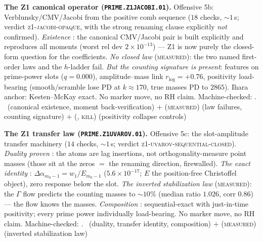 \par\smallskip\noindent\textbf{The Z1 canonical operator
(\texttt{PRIME.Z1JACOBI.01}).}
Offensive 5b: Verblunsky/CMV/Jacobi from the positive comb sequence
($18$ checks, ${\sim}1$\,s; verdict \textsc{z1-jacobi-opaque}, with
the strong renaming clause explicitly \emph{not} confirmed).
\emph{Existence} \mE: the canonical CMV/Jacobi pair is built
explicitly and reproduces all moments (worst rel dev
$2\times10^{-13}$) --- Z1 is now purely the closed-form question for
the coefficients.  \emph{No closed law} (\textsc{measured}): the two
named first-order laws and the $h$-ladder fail.  \emph{But the
counting signature is present}: features on prime-power slots
($q=0.000$), amplitude--mass link $r_{\log}=+0.76$, positivity
load-bearing (smooth/scramble lose PD at $k\approx170$, true masses
PD to $2865$).  Ihara anchor: Kesten--McKay exact.  No marker move,
no RH claim.
Machine-checked: .
\mE\ (canonical existence, moment back-verification) $+$
(\textsc{measured}) (law failures, counting signature) $+$ (\mE,
\textsc{kill}) (positivity collapse controls)
\par\smallskip


\par\smallskip\noindent\textbf{The Z1 transfer law
(\texttt{PRIME.Z1UVAROV.01}).}
Offensive 5c: the slot-amplitude transfer machinery ($14$ checks,
${\sim}1$\,s; verdict \textsc{z1-uvarov-sequential-closed}).
\emph{Duality proven} \mE: the atoms are lag insertions, not
orthogonality-measure point masses (those sit at the zeros $=$ the
renaming direction, firewalled).  \emph{The exact identity} \mE:
$\Delta\alpha_{m_0-1}=w_1/E_{m_0-1}$ ($5.6\times10^{-17}$; $E$ the
position-free Christoffel object), zero response below the slot.
\emph{The inverted stabilization law} (\textsc{measured}): the
$\Gamma$ flow predicts the counting masses to ${\sim}10\%$ (median
ratio $1.026$, corr $0.86$) --- the flow knows the masses.
\emph{Composition} \mE: sequential-exact with just-in-time
positivity; every prime power individually load-bearing.  No marker
move, no RH claim.
Machine-checked: .
\mE\ (duality, transfer identity, composition) $+$
(\textsc{measured}) (inverted stabilization law)
\par\smallskip


